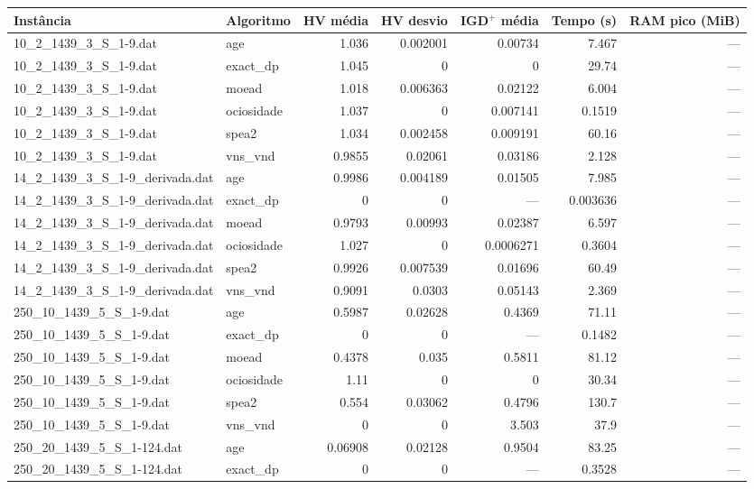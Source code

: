 \begin{tabular}{llrrrrr}
\hline
Instância & Algoritmo & HV média & HV desvio & IGD$^+$ média & Tempo (s) & RAM pico (MiB) \\
\hline
10\_2\_1439\_3\_S\_1-9.dat & age & 1.036 & 0.002001 & 0.00734 & 7.467 & — \\
10\_2\_1439\_3\_S\_1-9.dat & exact\_dp & 1.045 & 0 & 0 & 29.74 & — \\
10\_2\_1439\_3\_S\_1-9.dat & moead & 1.018 & 0.006363 & 0.02122 & 6.004 & — \\
10\_2\_1439\_3\_S\_1-9.dat & ociosidade & 1.037 & 0 & 0.007141 & 0.1519 & — \\
10\_2\_1439\_3\_S\_1-9.dat & spea2 & 1.034 & 0.002458 & 0.009191 & 60.16 & — \\
10\_2\_1439\_3\_S\_1-9.dat & vns\_vnd & 0.9855 & 0.02061 & 0.03186 & 2.128 & — \\
14\_2\_1439\_3\_S\_1-9\_derivada.dat & age & 0.9986 & 0.004189 & 0.01505 & 7.985 & — \\
14\_2\_1439\_3\_S\_1-9\_derivada.dat & exact\_dp & 0 & 0 & — & 0.003636 & — \\
14\_2\_1439\_3\_S\_1-9\_derivada.dat & moead & 0.9793 & 0.00993 & 0.02387 & 6.597 & — \\
14\_2\_1439\_3\_S\_1-9\_derivada.dat & ociosidade & 1.027 & 0 & 0.0006271 & 0.3604 & — \\
14\_2\_1439\_3\_S\_1-9\_derivada.dat & spea2 & 0.9926 & 0.007539 & 0.01696 & 60.49 & — \\
14\_2\_1439\_3\_S\_1-9\_derivada.dat & vns\_vnd & 0.9091 & 0.0303 & 0.05143 & 2.369 & — \\
250\_10\_1439\_5\_S\_1-9.dat & age & 0.5987 & 0.02628 & 0.4369 & 71.11 & — \\
250\_10\_1439\_5\_S\_1-9.dat & exact\_dp & 0 & 0 & — & 0.1482 & — \\
250\_10\_1439\_5\_S\_1-9.dat & moead & 0.4378 & 0.035 & 0.5811 & 81.12 & — \\
250\_10\_1439\_5\_S\_1-9.dat & ociosidade & 1.11 & 0 & 0 & 30.34 & — \\
250\_10\_1439\_5\_S\_1-9.dat & spea2 & 0.554 & 0.03062 & 0.4796 & 130.7 & — \\
250\_10\_1439\_5\_S\_1-9.dat & vns\_vnd & 0 & 0 & 3.503 & 37.9 & — \\
250\_20\_1439\_5\_S\_1-124.dat & age & 0.06908 & 0.02128 & 0.9504 & 83.25 & — \\
250\_20\_1439\_5\_S\_1-124.dat & exact\_dp & 0 & 0 & — & 0.3528 & — \\

\end{tabular}
